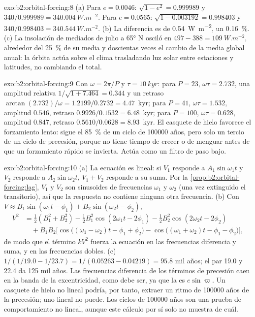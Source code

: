 \begin{solution}{exo:b2:orbital-forcing:8}
(a) Para $e = 0.0046$: $\sqrt{1 - e^2} = 0.999989$ y $340/0.999989 = \qty{340.004}{W.m^{-2}}$. Para
$e = 0.0565$: $\sqrt{1 - 0.003192} = 0.998403$ y $340/0.998403 = \qty{340.544}{W.m^{-2}}$. (b) La
diferencia es de \qty{0.54}{W.m^{-2}}, un \qty{0.16}{\percent}. (c) La insolación de mediados de julio a \ang{65} N
osciló en $497 - 388 = \qty{109}{W.m^{-2}}$, alrededor del \qty{25}{\percent} de su media y doscientas
veces el cambio de la media global anual: la órbita actúa sobre el clima trasladando luz solar entre
estaciones y latitudes, no cambiando el total.
\end{solution}

\begin{solution}{exo:b2:orbital-forcing:9}
Con $\omega = 2\pi/P$ y $\tau = \qty{10}{kyr}$: para $P = 23$, $\omega\tau = 2.732$, una amplitud
relativa $1/\sqrt{1 + 7.464} = 0.344$ y un retraso $\arctan(2.732)/\omega = 1.2199/0.2732 = 4.47$~kyr;
para $P = 41$, $\omega\tau = 1.532$, amplitud $0.546$, retraso $0.9926/0.1532 = 6.48$~kyr; para $P =
100$, $\omega\tau = 0.628$, amplitud $0.847$, retraso $0.5610/0.0628 = 8.93$~kyr. El casquete de hielo
favorece el forzamiento lento: sigue el \qty{85}{\percent} de un ciclo de \num{100000} años, pero solo un
tercio de un ciclo de precesión, porque no tiene tiempo de crecer o de menguar antes de que un forzamiento rápido
se invierta. Actúa como un filtro de paso bajo.
\end{solution}

\begin{solution}{exo:b2:orbital-forcing:10}
(a) La ecuación es lineal: si $V_1$ responde a $A_1\sin\omega_1t$ y $V_2$ responde a
$A_2\sin\omega_2t$, $V_1 + V_2$ responde a su suma. Por la \cref{prop:b2:orbital-forcing:lag}, $V_1$ y
$V_2$ son sinusoides de frecuencias $\omega_1$ y $\omega_2$ (una vez extinguido el transitorio), así que
la respuesta no contiene ninguna otra frecuencia. (b) Con $V \approx B_1\sin(\omega_1t - \phi_1) +
B_2\sin(\omega_2t - \phi_2)$,
\[
\begin{aligned}
  V^2 &= \tfrac12(B_1^2 + B_2^2) - \tfrac12B_1^2\cos(2\omega_1t - 2\phi_1) -
  \tfrac12B_2^2\cos(2\omega_2t - 2\phi_2)\\
  &\quad + B_1B_2\bigl[\cos\bigl((\omega_1 - \omega_2)t - \phi_1 + \phi_2\bigr) -
  \cos\bigl((\omega_1 + \omega_2)t - \phi_1 - \phi_2\bigr)\bigr],
\end{aligned}
\]
de modo que el término $kV^2$ fuerza la ecuación en las frecuencias diferencia y suma, y en las frecuencias
dobles. (c) $1/(1/19.0 - 1/23.7) = 1/(0.05263 - 0.04219) = 95.8$ mil años; el par 19.0
y 22.4 da 125 mil años. Las frecuencias diferencia de los términos de precesión caen en la
banda de la excentricidad, como debe ser, ya que la  es $e\sin\varpi$. Un casquete de hielo no lineal
podría, por tanto, extraer un ritmo de \num{100000} años de la precesión; uno lineal no
puede. Los ciclos de \num{100000} años son una prueba de comportamiento no lineal, aunque este cálculo
por sí solo no muestra de cuál.
\end{solution}

